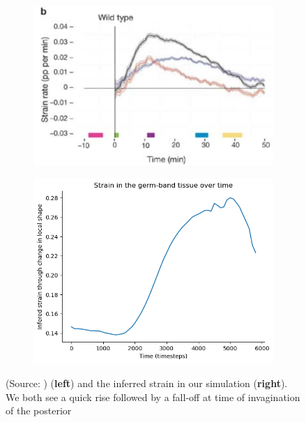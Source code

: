 \begin{figure}[H]
    \centering
    \begin{subfigure}{0.45\linewidth}
        \centering
        \includegraphics[width = \linewidth]{chapters/Results/figures/strain_rate_extrinsic.png}
    \end{subfigure}
        \begin{subfigure}{0.45\linewidth}
        \centering
        \includegraphics[width = \linewidth]{chapters/Results/figures/strain_smoothedpng.png}
    \end{subfigure}
    \caption{(Source: ) (\textbf{left}) and the inferred strain in our simulation (\textbf{right}).\\
    We both see a quick rise followed by a fall-off at time of invagination of the posterior\\}
    \label{fig:strain}
\end{figure}

